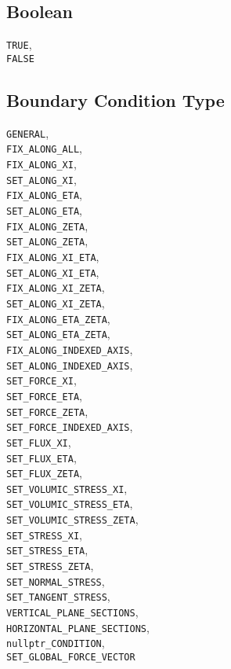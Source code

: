\documentclass[10pt]{article}
\begin{document}
\subsection{Boolean}
	\verb+TRUE+,\\
	\verb+FALSE+


\subsection{Boundary Condition Type}

	\verb+GENERAL+,\\
	\verb+FIX_ALONG_ALL+,\\
	\verb+FIX_ALONG_XI+,\\
	\verb+SET_ALONG_XI+,\\
	\verb+FIX_ALONG_ETA+,\\
	\verb+SET_ALONG_ETA+,\\
	\verb+FIX_ALONG_ZETA+,\\
	\verb+SET_ALONG_ZETA+,\\
	\verb+FIX_ALONG_XI_ETA+,\\
	\verb+SET_ALONG_XI_ETA+,\\
	\verb+FIX_ALONG_XI_ZETA+,\\
	\verb+SET_ALONG_XI_ZETA+,\\
	\verb+FIX_ALONG_ETA_ZETA+,\\
	\verb+SET_ALONG_ETA_ZETA+,\\
	\verb+FIX_ALONG_INDEXED_AXIS+,\\
	\verb+SET_ALONG_INDEXED_AXIS+,\\
	\verb+SET_FORCE_XI+,\\
	\verb+SET_FORCE_ETA+,\\
	\verb+SET_FORCE_ZETA+,\\
	\verb+SET_FORCE_INDEXED_AXIS+,\\
	\verb+SET_FLUX_XI+,\\
	\verb+SET_FLUX_ETA+,\\
	\verb+SET_FLUX_ZETA+,\\
	\verb+SET_VOLUMIC_STRESS_XI+,\\
	\verb+SET_VOLUMIC_STRESS_ETA+,\\
	\verb+SET_VOLUMIC_STRESS_ZETA+,\\
	\verb+SET_STRESS_XI+,\\
	\verb+SET_STRESS_ETA+,\\
	\verb+SET_STRESS_ZETA+,\\
	\verb+SET_NORMAL_STRESS+,\\
	\verb+SET_TANGENT_STRESS+,\\
	\verb+VERTICAL_PLANE_SECTIONS+,\\
	\verb+HORIZONTAL_PLANE_SECTIONS+,\\
	\verb+nullptr_CONDITION+,\\
	\verb+SET_GLOBAL_FORCE_VECTOR+
\end{document}
